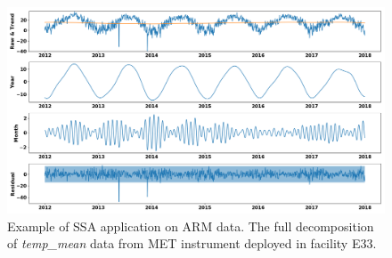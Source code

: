 \begin{figure}[ht]
    \centering
    \includegraphics[width=\textwidth]{figures/E33.png}
    \caption{Example of SSA application on ARM data. The full decomposition of \textit{temp\_mean} data from MET instrument deployed in facility E33.}
    \label{fig:ssa}
\end{figure}

